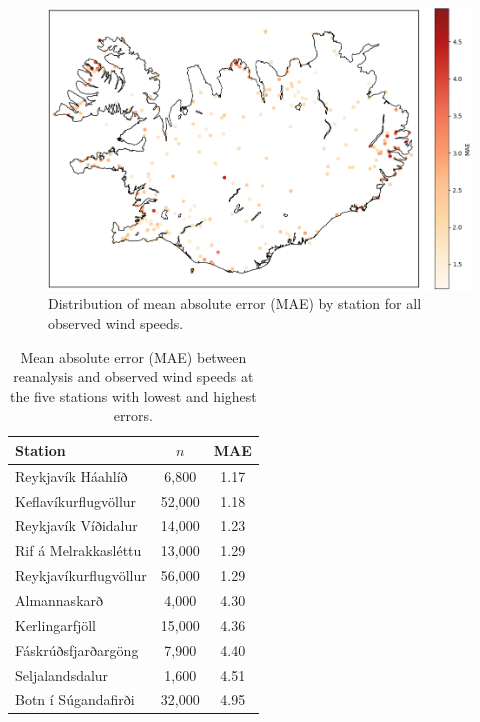 \begin{figure}[h]
  \centering
  \includegraphics[scale=0.6]{Figures/MAEoverIceland.png}
  \caption[MAE distribution by station]{Distribution of mean absolute error (MAE) by station for all observed wind speeds.}
  \label{fig:station_mae_distribution}
\end{figure}

\begin{table}[h]
  \centering
  \caption[Station MAE extremes]{Mean absolute error (MAE) between reanalysis and observed wind speeds at the five stations with lowest and highest errors.}
  \label{table:station_mae_distribution}
  \begin{tabular}{lcc}
    \toprule
    Station               & $n$     & MAE  \\
    \midrule
    Reykjavík Háahlíð     & 6,800   & 1.17 \\
    Keflavíkurflugvöllur  & 52,000  & 1.18 \\
    Reykjavík Víðidalur   & 14,000  & 1.23 \\
    Rif á Melrakkasléttu  & 13,000  & 1.29 \\
    Reykjavíkurflugvöllur & 56,000  & 1.29 \\
    \midrule
    Almannaskarð          &  4,000  & 4.30 \\
    Kerlingarfjöll        & 15,000  & 4.36 \\
    Fáskrúðsfjarðargöng   &  7,900  & 4.40 \\
    Seljalandsdalur       &  1,600  & 4.51 \\
    Botn í Súgandafirði   & 32,000  & 4.95 \\
    \bottomrule
  \end{tabular}
\end{table}

